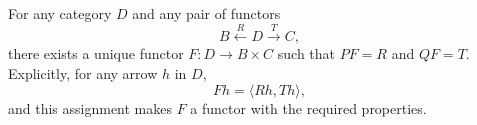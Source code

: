 For any category $D$ and any pair of functors
$$B \xleftarrow{R} D \xrightarrow{T} C,$$
there exists a unique functor $F: D \to B \times C$ such that $PF = R$ and $QF = T$. Explicitly, for any arrow $h$ in $D$,
$$Fh = \langle Rh, Th \rangle,$$
and this assignment makes $F$ a functor with the required properties.
